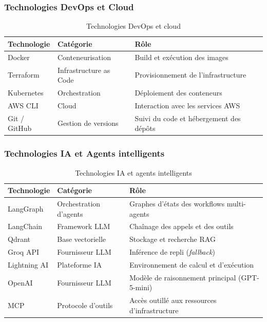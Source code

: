 \subsubsection{Technologies DevOps et Cloud}

\begin{table}[H]
    \centering
    \caption{Technologies DevOps et cloud}
    \label{tab:tech-devops}
    \begin{tabularx}{\textwidth}{@{}>{\raggedright\arraybackslash}p{3.2cm} >{\raggedright\arraybackslash}p{3.8cm} >{\raggedright\arraybackslash}X@{}}
        \hline
        \textbf{Technologie} & \textbf{Catégorie} & \textbf{Rôle} \\
        \hline
        Docker & Conteneurisation & Build et exécution des images \\
        Terraform & Infrastructure as Code & Provisionnement de l'infrastructure \\
        Kubernetes & Orchestration & Déploiement des conteneurs \\
        AWS CLI & Cloud & Interaction avec les services AWS \\
        Git / GitHub & Gestion de versions & Suivi du code et hébergement des dépôts \\
        \hline
    \end{tabularx}
\end{table}

\subsubsection{Technologies IA et Agents intelligents}

\begin{table}[H]
    \centering
    \caption{Technologies IA et agents intelligents}
    \label{tab:tech-ia}
    \begin{tabularx}{\textwidth}{@{}>{\raggedright\arraybackslash}p{3.2cm} >{\raggedright\arraybackslash}p{3.8cm} >{\raggedright\arraybackslash}X@{}}
        \hline
        \textbf{Technologie} & \textbf{Catégorie} & \textbf{Rôle} \\
        \hline
        LangGraph & Orchestration d'agents & Graphes d'états des workflows multi-agents \\
        LangChain & Framework LLM & Chaînage des appels et des outils \\
        Qdrant & Base vectorielle & Stockage et recherche RAG \\
        Groq API & Fournisseur LLM & Inférence de repli (\textit{fallback}) \\
        Lightning AI & Plateforme IA & Environnement de calcul et d'exécution \\
        OpenAI & Fournisseur LLM & Modèle de raisonnement principal (GPT-5-mini) \\
        MCP & Protocole d'outils & Accès outillé aux ressources d'infrastructure \\
        \hline
    \end{tabularx}
\end{table}

